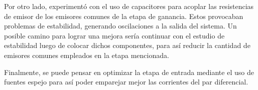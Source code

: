 Por otro lado, experimentó con el uso de capacitores para acoplar las resistencias de emisor de los emisores comunes de la etapa de ganancia. Estos provocaban problemas de estabilidad, generando oscilaciones a la salida del sistema. Un posible camino para lograr una mejora sería continuar con el estudio de estabilidad luego de colocar dichos componentes, para así reducir la cantidad de emisores comunes empleados en la etapa mencionada.

Finalmente, se puede pensar en optimizar la etapa de entrada mediante el uso de fuentes espejo para así poder emparejar mejor las corrientes del par diferencial.